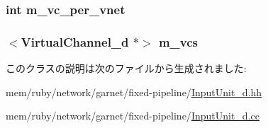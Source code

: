 \label{classInputUnit__d_a81d53a65b375007289068e764da769d8}
\hypertarget{classInputUnit__d_a2d66b8cad5144408ed492eeff4d37c2f}{
\subsubsection[{m\_\-vc\_\-per\_\-vnet}]{\setlength{\rightskip}{0pt plus 5cm}int {\bf m\_\-vc\_\-per\_\-vnet}}}
\label{classInputUnit__d_a2d66b8cad5144408ed492eeff4d37c2f}
\hypertarget{classInputUnit__d_a3d476d71a2907d1a278c66e3f6d4733c}{
\subsubsection[{m\_\-vcs}]{$<${\bf VirtualChannel\_\-d} $\ast$$>$ {\bf m\_\-vcs}}}
\label{classInputUnit__d_a3d476d71a2907d1a278c66e3f6d4733c}


このクラスの説明は次のファイルから生成されました:\begin{DoxyCompactItemize}
\item 
mem/ruby/network/garnet/fixed-\/pipeline/\hyperlink{InputUnit__d_8hh}{InputUnit\_\-d.hh}\item 
mem/ruby/network/garnet/fixed-\/pipeline/\hyperlink{InputUnit__d_8cc}{InputUnit\_\-d.cc}\end{DoxyCompactItemize}
